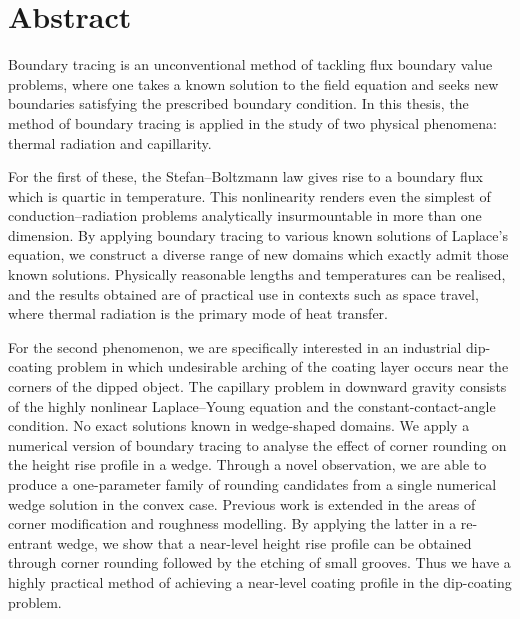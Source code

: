 \chapter*{Abstract}
\label{ch:abstract}

Boundary tracing is an unconventional method
of tackling flux boundary value problems,
where one takes a known solution to the field equation
and seeks new boundaries satisfying the prescribed boundary condition.
In this thesis, the method of boundary tracing is applied
in the study of two physical phenomena:
thermal radiation and capillarity.

For the first of these,
the Stefan--Boltzmann law gives rise
to a boundary flux which is quartic in temperature.
This nonlinearity renders
even the simplest of conduction--radiation problems
analytically insurmountable in more than one dimension.
By applying boundary tracing to various known solutions of Laplace's equation,
we construct a diverse range of new domains
which exactly admit those known solutions.
Physically reasonable lengths and temperatures can be realised,
and the results obtained are of practical use
in contexts such as space travel,
where thermal radiation is the primary mode of heat transfer.

For the second phenomenon,
we are specifically interested in an industrial dip-coating problem
in which undesirable arching of the coating layer
occurs near the corners of the dipped object.
The capillary problem in downward gravity
consists of the highly nonlinear Laplace--Young equation
and the constant-contact-angle condition.
No exact solutions known in wedge-shaped domains.
We apply a numerical version of boundary tracing
to analyse the effect of corner rounding
on the height rise profile in a wedge.
Through a novel observation,
we are able to produce a one-parameter family of rounding candidates
from a single numerical wedge solution in the convex case.
Previous work is extended
in the areas of corner modification and roughness modelling.
By applying the latter in a re-entrant wedge,
we show that a near-level height rise profile can be obtained
through corner rounding followed by the etching of small grooves.
Thus we have a highly practical method
of achieving a near-level coating profile
in the dip-coating problem.
